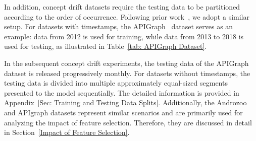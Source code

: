 In addition, concept drift datasets require the testing data to be partitioned according to the order of occurrence.
Following prior work~\cite{2023-Usenix-chenyizhen}, we adopt a similar setup. 
For datasets with timestamps, the APIGraph~\cite{2020-CCS-APIGraph} dataset serves as an example: data from 2012 is used for training, while data from 2013 to 2018 is used for testing, as illustrated in Table~\ref{tab: APIGraph Dataset}.
\begin{table}[h!]
	\caption{Android Concept Drift Dataset (APIGraph)}
	\label{tab: APIGraph Dataset}
	\setlength{\tabcolsep}{5.8pt}
	\begin{center}
	\end{center}
\end{table}
In the subsequent concept drift experiments, the testing data of the APIGraph dataset is released progressively monthly.
For datasets without timestamps, the testing data is divided into multiple approximately equal-sized segments presented to the model sequentially.
The detailed information is provided in Appendix~\ref{Sec: Training and Testing Data Splits}.
Additionally, the Androzoo and APIgraph datasets represent similar scenarios and are primarily used for analyzing the impact of feature selection. Therefore, they are discussed in detail in Section~\ref{Impact of Feature Selection}.


